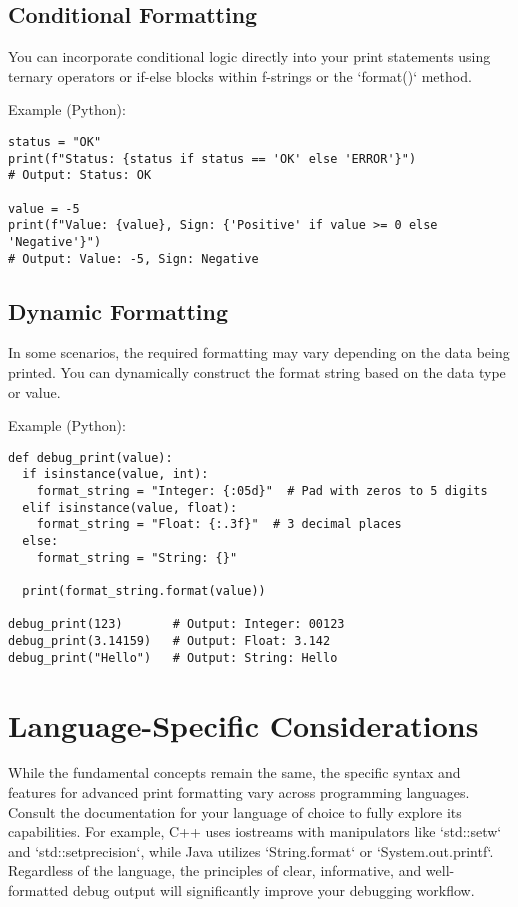 \documentclass{article}
\begin{document}
\subsection*{Conditional Formatting}

You can incorporate conditional logic directly into your print statements using ternary operators or if-else blocks within f-strings or the `format()` method.

Example (Python):

\begin{verbatim}
status = "OK"
print(f"Status: {status if status == 'OK' else 'ERROR'}")
# Output: Status: OK

value = -5
print(f"Value: {value}, Sign: {'Positive' if value >= 0 else 'Negative'}")
# Output: Value: -5, Sign: Negative
\end{verbatim}

\subsection*{Dynamic Formatting}

In some scenarios, the required formatting may vary depending on the data being printed. You can dynamically construct the format string based on the data type or value.

Example (Python):

\begin{verbatim}
def debug_print(value):
  if isinstance(value, int):
    format_string = "Integer: {:05d}"  # Pad with zeros to 5 digits
  elif isinstance(value, float):
    format_string = "Float: {:.3f}"  # 3 decimal places
  else:
    format_string = "String: {}"

  print(format_string.format(value))

debug_print(123)       # Output: Integer: 00123
debug_print(3.14159)   # Output: Float: 3.142
debug_print("Hello")   # Output: String: Hello
\end{verbatim}

\section*{Language-Specific Considerations}

While the fundamental concepts remain the same, the specific syntax and features for advanced print formatting vary across programming languages.  Consult the documentation for your language of choice to fully explore its capabilities.  For example, C++ uses iostreams with manipulators like `std::setw` and `std::setprecision`, while Java utilizes `String.format` or `System.out.printf`.  Regardless of the language, the principles of clear, informative, and well-formatted debug output will significantly improve your debugging workflow.
\end{document}
